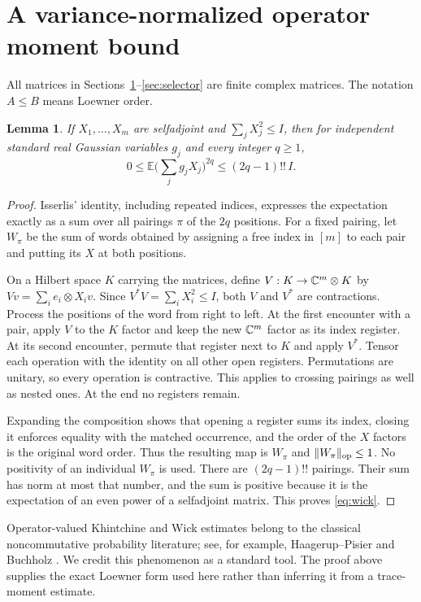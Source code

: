 \documentclass[11pt]{article}
\newtheorem{lemma}[theorem]{Lemma}
\theoremstyle{remark}\newtheorem{remark}[theorem]{Remark}
\numberwithin{equation}{section}
\newcommand{\E}{\mathbb E}\newcommand{\Prob}{\mathbb P}
\newcommand{\norm}[1]{\lVert #1\rVert}
\begin{document}
\section{A variance-normalized operator moment bound}\label{sec:wick}
All matrices in Sections~\ref{sec:wick}--\ref{sec:selector} are finite
complex matrices. The notation $A\le B$ means Loewner order.
\begin{lemma}\label{lem:wick}
If $X_1,\ldots,X_m$ are selfadjoint and $\sum_jX_j^2\le I$, then for
independent standard real Gaussian variables $g_j$ and every integer
$q\ge1$,
\begin{equation}\label{eq:wick}
 0\le \E\Big(\sum_jg_jX_j\Big)^{2q}\le (2q-1)!!\,I.
\end{equation}
\end{lemma}
\begin{proof}
Isserlis' identity, including repeated indices, expresses the expectation
exactly as a sum over all pairings $\pi$ of the $2q$ positions. For a fixed
pairing, let $W_\pi$ be the sum of words obtained by assigning a free index
in $[m]$ to each pair and putting its $X$ at both positions.

On a Hilbert space $K$ carrying the matrices, define
$V:K\to\mathbb C^m\otimes K$ by $Vv=\sum_i e_i\otimes X_iv$. Since
$V^*V=\sum_iX_i^2\le I$, both $V$ and $V^*$ are contractions.
Process the positions of the word from right to left. At the first
encounter with a pair, apply $V$ to the $K$ factor and keep the new
$\mathbb C^m$ factor as its index register. At its second encounter, permute
that register next to $K$ and apply $V^*$. Tensor each operation with the
identity on all other open registers. Permutations are unitary, so every
operation is contractive. This applies to crossing pairings as well as
nested ones. At the end no registers remain.

Expanding the composition shows that opening a register sums its index,
closing it enforces equality with the matched occurrence, and the order
of the $X$ factors is the original word order. Thus the resulting map is
$W_\pi$ and $\norm{W_\pi}_{\op}\le1$. No positivity of an individual
$W_\pi$ is used. There are $(2q-1)!!$ pairings. Their sum has norm at most
that number, and the sum is positive because it is the expectation of
an even power of a selfadjoint matrix. This proves \eqref{eq:wick}.
\end{proof}
Operator-valued Khintchine and Wick estimates belong to the classical
noncommutative probability literature; see, for example,
Haagerup--Pisier \cite{HP} and Buchholz \cite{Buchholz}. We credit this
phenomenon as a standard tool. The proof above supplies the exact Loewner
form used here rather than inferring it from a trace-moment estimate.
\end{document}
